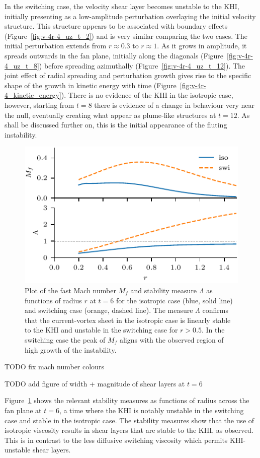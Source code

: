 In the switching case, the velocity shear layer becomes unstable to the KHI, initially presenting as a low-amplitude perturbation overlaying the initial velocity structure. This structure appears to be associated with boundary effects (Figure~\ref{fig:v-4r-4_uz_t_2}) and is very similar comparing the two cases. The initial perturbation extends from $r\approx0.3$ to $r\approx1$. As it grows in amplitude, it spreads outwards in the fan plane, initially along the diagonals (Figure~\ref{fig:v-4r-4_uz_t_8}) before spreading azimuthally (Figure~\ref{fig:v-4r-4_uz_t_12}). The joint effect of radial spreading and perturbation growth gives rise to the specific shape of the growth in kinetic energy with time (Figure~\ref{fig:v-4r-4_kinetic_energy}). There is no evidence of the KHI in the isotropic case, however, starting from $t=8$ there is evidence of a change in behaviour very near the null, eventually creating what appear as plume-like structures at $t=12$. As shall be discussed further on, this is the initial appearance of the fluting instability.

\begin{figure}[t]
  \centering
  \includegraphics[width=0.5\linewidth]{v-4r-4_mach_t_6}
  \caption{Plot of the fast Mach number $M_f$ and stability measure $\Lambda$ as functions of radius $r$ at $t=6$ for the isotropic case (blue, solid line) and switching case (orange, dashed line). The measure $\Lambda$ confirms that the current-vortex sheet in the isotropic case is linearly stable to the KHI and unstable in the switching case for $r>0.5$. In the switching case the peak of $M_f$ aligns with the observed region of high growth of the instability.}%
  \label{fig:v-4r-4_mach_t_6}
\end{figure}

TODO fix mach number colours

TODO add figure of width + magnitude of shear layers at $t=6$

Figure~\ref{fig:v-4r-4_mach_t_6} shows the relevant stability measures as functions of radius across the fan plane at $t=6$, a time where the KHI is notably unstable in the switching case and stable in the isotropic case. The stability measures show that the use of isotropic viscosity results in shear layers that are stable to the KHI, as observed. This is in contrast to the less diffusive switching viscosity which permits KHI-unstable shear layers.

